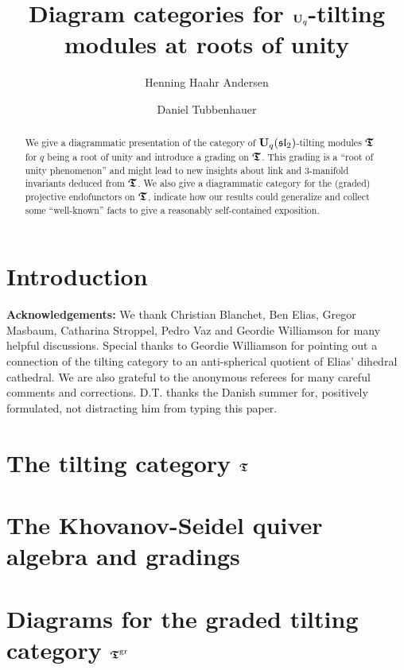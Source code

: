 \documentclass[12pt]{amsart}
\title[Diagram categories for $\Uq$-tilting modules at roots of unity]{Diagram categories for $\Uq$-tilting modules at roots of unity}
\author{Henning Haahr Andersen}
\author{Daniel Tubbenhauer}
\begin{document}
\begin{abstract}
We give a diagrammatic presentation of the category 
of $\boldsymbol{\mathrm{U}}_q(\mathfrak{sl}_2)$-tilting modules $\boldsymbol{\mathfrak{T}}$ 
for $q$ being a root of unity and 
introduce a grading on $\boldsymbol{\mathfrak{T}}$. This grading is 
a ``root of unity phenomenon'' and might lead 
to new insights about link and 
$3$-manifold invariants deduced from $\boldsymbol{\mathfrak{T}}$.
We also give a diagrammatic 
category for the (graded) projective 
endofunctors on $\boldsymbol{\mathfrak{T}}$, indicate how 
our results could generalize 
and collect some ``well-known'' 
facts to give a reasonably self-contained exposition.
\end{abstract}
\maketitle


\vspace*{-.5cm}

\tableofcontents

\vspace*{-.5cm}

%
\section{Introduction}\label{sec-intro}
%

%
\noindent \textbf{Acknowledgements:} We thank 
Christian Blanchet, Ben Elias, Gregor Masbaum, Catharina Stroppel, Pedro Vaz and 
Geordie Williamson for many helpful discussions. 
Special thanks to Geordie Williamson for pointing 
out a connection of the tilting category to an 
anti-spherical quotient of Elias' dihedral cathedral. We are also 
grateful to the anonymous referees for many careful comments and corrections.
D.T. thanks the Danish summer for, 
positively formulated, not distracting him from typing this paper.
%
\section{The tilting category \texorpdfstring{$\boldsymbol{\mathfrak{T}}$}{T}}\label{sec-tilting}
%

%
\section{The Khovanov-Seidel quiver algebra and gradings}\label{sec-quiver}
%

%
\section{Diagrams for the graded tilting category \texorpdfstring{$\boldsymbol{\mathfrak{T}}^{\mathrm{gr}}$}{Tgr}}\label{sec-dia}
%

%
\end{document}
